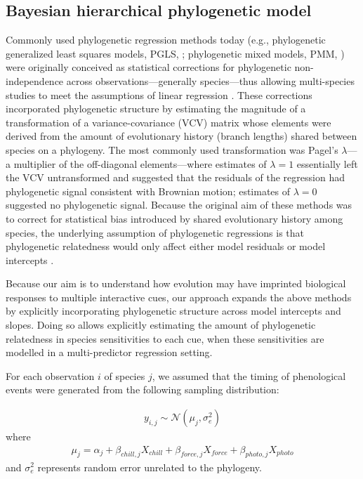 \documentclass[11pt]{article}
\begin{document}
\subsection*{Bayesian hierarchical phylogenetic model}
Commonly used phylogenetic regression methods today (e.g., phylogenetic generalized least squares models, PGLS, \cite{freckleton2002phylogenetic}; phylogenetic mixed models, PMM, \cite{housworth2004phylogenetic}) were originally conceived as statistical corrections for phylogenetic non-independence across observations---generally species---thus allowing multi-species studies to meet the assumptions of linear regression \citep{freckleton2002phylogenetic}. These corrections incorporated phylogenetic structure by estimating the magnitude of a transformation of a variance-covariance (VCV) matrix whose elements were derived from the amount of evolutionary history (branch lengths) shared between species on a phylogeny. The most commonly used transformation was Pagel's $\lambda$---a multiplier of the off-diagonal elements---where estimates of $\lambda = 1$ essentially left the VCV untransformed and suggested that the residuals of the regression had phylogenetic signal consistent with Brownian motion; estimates of $\lambda = 0$ suggested no phylogenetic signal. 
Because the original aim of these methods was to correct for statistical bias introduced by shared evolutionary history among species, the underlying assumption of phylogenetic regressions is that phylogenetic relatedness would only affect either model residuals \citep[in PGLS approaches,][]{freckleton2002phylogenetic} or model intercepts \citep[e.g., in many PMM approaches,][]{housworth2004phylogenetic}.

Because our aim is to understand how evolution may have imprinted biological responses to multiple interactive cues, our approach expands the above methods by explicitly incorporating phylogenetic structure across model intercepts and slopes. Doing so allows explicitly estimating the amount of phylogenetic relatedness in species sensitivities to each cue, when these sensitivities are modelled in a multi-predictor regression setting.  

For each observation $i$ of species $j$, we assumed that the timing of phenological events were generated from the following sampling distribution:

\begin{align}
  \label{modely}
  y_{i,j} \sim \mathcal{N}(\mu_j, \sigma_e^2)
\end{align}
where
\begin{align}
  \label{modelmu}
  \mu_j = \alpha_j + \beta_{chill,j} X_{chill} + \beta_{force,j} X_{force} + \beta_{photo,j} X_{photo}
\end{align}
and $\sigma_e^2$ represents random error unrelated to the phylogeny. 
\end{document}
